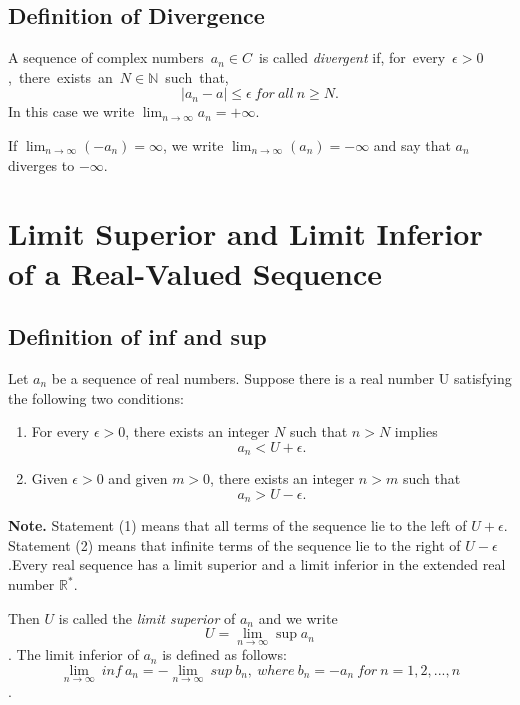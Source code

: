 \documentclass[12pt]{article}
\begin{document}
\subsection{Definition of Divergence}
A sequence of complex numbers\ $a_{n}\in C$\ is called \textit{divergent} if,
for\ every\ $\epsilon>0$,\ there\ exists\ an\ $N\in\mathbb{N}$\ such\ that,
$$|a_{n}-a|\leq\epsilon\ for\ all\ n\geq N.$$
In this case we write $\lim_{n\rightarrow\infty}a_{n}=+\infty$.

If $\lim_{n\rightarrow\infty}(-a_{n})=\infty$, we write $\lim_{n\rightarrow\infty}(a_{n})=-\infty$ and say that $a_{n}$ 
diverges to $-\infty$. 

\section{Limit Superior and Limit Inferior of a Real-Valued Sequence}
\subsection{Definition of inf and sup}
Let ${a_{n}}$ be a sequence of real numbers. Suppose there is a real number U 
satisfying the following two conditions:

\begin{enumerate}
    \item For every $\epsilon > 0$, there exists an integer $N$ such that $n>N$ 
    implies $$a_{n}<U+\epsilon.$$
    \item Given $\epsilon>0$ and given $m>0$, there exists an integer $n>m$ such that 
    $$a_{n}>U-\epsilon.$$ 
\end{enumerate}

\textbf{Note.} Statement (1) means that all terms of the sequence lie to the left 
of $U+\epsilon$. Statement (2) means that infinite terms of the sequence lie to the 
right of $U-\epsilon$.Every real sequence has a limit superior and a limit inferior 
in the extended real number $\mathbb{R^{*}}$.

Then $U$ is called the \textit{limit superior} of ${a_{n}}$
and we write $$U=\lim_{n\rightarrow \infty}\sup{a_{n}}$$.
The limit inferior of ${a_{n}}$ is defined as follows:
$$\lim_{n\rightarrow \infty}\ inf\ a_{n}=-\lim_{n\rightarrow \infty}\ sup\ b_{n},\ where\ b_{n}=-a_{n}\ for\ n=1,2,...,n$$.
\end{document}
